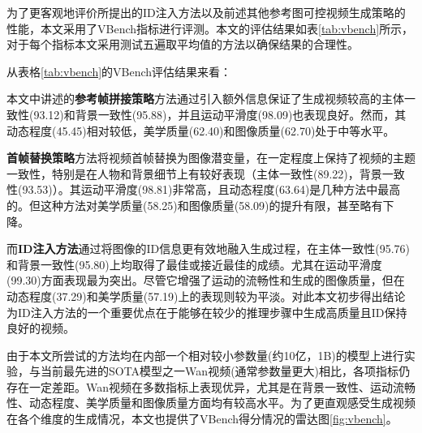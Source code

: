 为了更客观地评价所提出的ID注入方法以及前述其他参考图可控视频生成策略的性能，本文采用了VBench\cite{huang2023vbench,huang2024vbench++,zheng2025vbench2}指标进行评测。本文的评估结果如表\ref{tab:vbench}所示，对于每个指标本文采用测试五遍取平均值的方法以确保结果的合理性。
\begin{table*}[t]
\centering
\caption{不同方法在VBench各项指标上的表现对比}
\scriptsize
\setlength{\tabcolsep}{2pt}
\renewcommand{\arraystretch}{1.0}
\vspace{-0.1in}
\label{tab:vbench}
\end{table*}


从表格\ref{tab:vbench}的VBench评估结果来看：

本文中讲述的\textbf{参考帧拼接策略}方法通过引入额外信息保证了生成视频较高的主体一致性(93.12)和背景一致性(95.88)，并且运动平滑度(98.09)也表现良好。然而，其动态程度(45.45)相对较低，美学质量(62.40)和图像质量(62.70)处于中等水平。

\textbf{首帧替换策略}方法将视频首帧替换为图像潜变量，在一定程度上保持了视频的主题一致性，特别是在人物和背景细节上有较好表现（主体一致性(89.22)，背景一致性(93.53)）。其运动平滑度(98.81)非常高，且动态程度(63.64)是几种方法中最高的。但这种方法对美学质量(58.25)和图像质量(58.09)的提升有限，甚至略有下降。

而\textbf{ID注入方法}通过将图像的ID信息更有效地融入生成过程，在主体一致性(95.76)和背景一致性(95.80)上均取得了最佳或接近最佳的成绩。尤其在运动平滑度(99.30)方面表现最为突出。尽管它增强了运动的流畅性和生成的图像质量，但在动态程度(37.29)和美学质量(57.19)上的表现则较为平淡。对此本文初步得出结论为ID注入方法的一个重要优点在于能够在较少的推理步骤中生成高质量且ID保持良好的视频。

由于本文所尝试的方法均在内部一个相对较小参数量(约10亿，1B)的模型上进行实验，与当前最先进的SOTA模型之一Wan视频\cite{wan2025}(通常参数量更大)相比，各项指标仍存在一定差距。Wan视频在多数指标上表现优异，尤其是在背景一致性、运动流畅性、动态程度、美学质量和图像质量方面均有较高水平。为了更直观感受生成视频在各个维度的生成情况，本文也提供了VBench得分情况的雷达图\ref{fig:vbench}。

